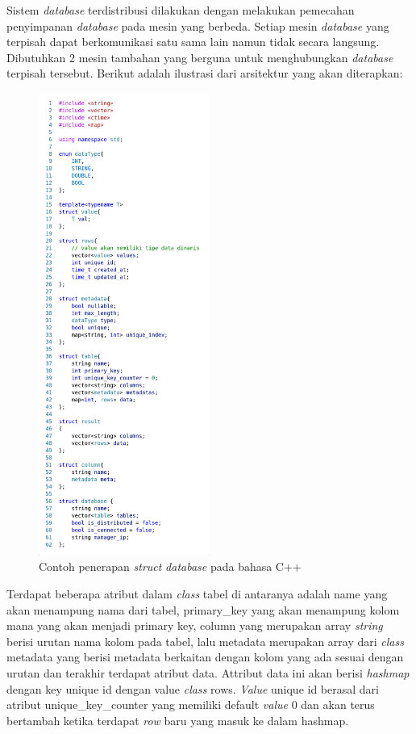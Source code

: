 Sistem \emph{database} terdistribusi dilakukan dengan melakukan pemecahan penyimpanan 
\emph{database} pada mesin yang berbeda. Setiap mesin \emph{database} yang terpisah dapat 
berkomunikasi satu sama lain namun tidak secara langsung. Dibutuhkan 2 mesin 
tambahan yang berguna untuk menghubungkan \emph{database} terpisah tersebut. Berikut 
adalah ilustrasi dari arsitektur yang akan diterapkan:
\begin{figure}[H]
  \centering{}
  \includegraphics[width=0.5\textwidth]{gambar/bab3/structure_struct_database}
  \caption{Contoh penerapan \emph{struct} \emph{database} pada bahasa C++}
\end{figure}

Terdapat beberapa atribut dalam \emph{class} tabel di antaranya adalah name yang akan 
menampung nama dari tabel, primary\_key yang akan menampung kolom mana yang akan 
menjadi primary key, column yang merupakan array \emph{string} berisi urutan nama kolom 
pada tabel, lalu metadata merupakan array dari \emph{class} metadata yang berisi metadata 
berkaitan dengan kolom yang ada sesuai dengan urutan dan terakhir terdapat atribut 
data. Attribut data ini akan berisi \emph{hashmap} dengan key unique id dengan value 
\emph{class} rows. \emph{Value} unique id berasal dari atribut unique\_key\_counter yang memiliki 
default \emph{value} 0 dan akan terus bertambah ketika terdapat \emph{row} baru yang masuk ke dalam 
hashmap.


